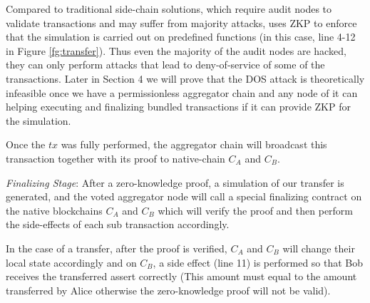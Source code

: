 Compared to traditional side-chain solutions, which require audit nodes to validate transactions and may suffer from majority attacks, \dprotocol uses ZKP to enforce that the simulation is carried out on predefined functions (in this case, line 4-12 in Figure \ref{fg:transfer}). Thus even the majority of the audit nodes are hacked, they can only perform attacks that lead to deny-of-service of some of the transactions. Later in Section 4 we will prove that the DOS attack is theoretically infeasible once we have a permissionless aggregator chain and any node of it can helping executing and finalizing bundled transactions if it can provide ZKP for the simulation.

Once the $tx$ was fully performed, the aggregator chain will broadcast this transaction together with its proof to native-chain $C_A$ and $C_B$.

\smallskip\noindent\emph{Finalizing Stage}:
After a zero-knowledge proof, a simulation of our transfer is generated, and the voted aggregator node will call a special finalizing contract on the native blockchains $C_A$ and $C_B$ which will verify the proof and then perform the side-effects of each sub transaction accordingly.

In the case of a transfer, after the proof is verified, $C_A$ and $C_B$ will change their local state accordingly and on $C_B$, a side effect (line 11) is performed so that Bob receives the transferred assert correctly (This amount must equal to the amount transferred by Alice otherwise the zero-knowledge proof will not be valid).





